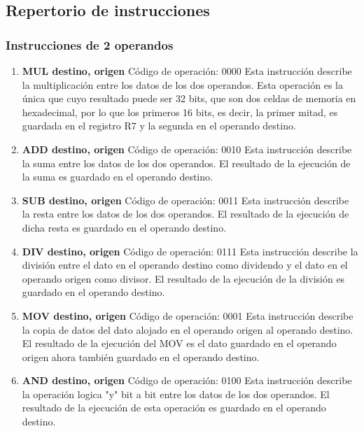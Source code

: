 \subsection{Repertorio de instrucciones}

\subsubsection{Instrucciones de 2 operandos}

\begin{enumerate}
\item \textbf{MUL destino, origen}
Código de operación: 0000
Esta instrucción describe la multiplicación entre los datos de los dos operandos. Esta operación es la única que cuyo resultado puede ser 32 bits, que son dos celdas de memoria en hexadecimal, por lo que los primeros 16 bits, es decir, la primer mitad, es guardada en el registro R7 y la segunda en el operando destino.
 
\item \textbf{ADD destino, origen}
Código de operación: 0010
Esta instrucción describe la suma entre los datos de los dos operandos. El resultado de la ejecución de la suma es guardado en el operando destino.

\item \textbf{SUB destino, origen}
Código de operación: 0011
Esta instrucción describe la resta entre los datos de los dos operandos. El resultado de la ejecución de dicha resta es guardado en el operando destino.

\item \textbf{DIV destino, origen}
Código de operación: 0111
Esta instrucción describe la división entre el dato en el operando destino como dividendo y el dato en el operando origen como divisor. El resultado de la ejecución de la división es guardado en el operando destino.

\item \textbf{MOV destino, origen}
Código de operación: 0001
Esta instrucción describe la copia de datos del dato alojado en el operando origen al operando destino. El resultado de la ejecución del MOV es el dato guardado en el operando origen ahora también guardado en el operando destino.

\item \textbf{AND destino, origen}
Código de operación: 0100
Esta instrucción describe la operación logica "y" bit a bit entre los datos de los dos operandos. El resultado de la ejecución de esta operación es guardado en el operando destino.


\end{enumerate}
